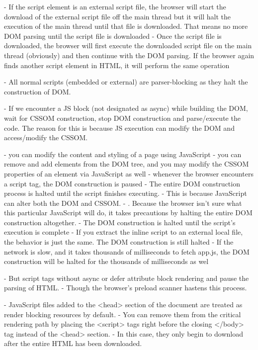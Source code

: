 - If the script element is an external script file, the browser will start the download of the external script file off the main thread but it will halt the execution of the main thread until that file is downloaded. That means no more DOM parsing until the script file is downloaded
- Once the script file is downloaded, the browser will first execute the downloaded script file on the main thread (obviously) and then continue with the DOM parsing. If the browser again finds another script element in HTML, it will perform the same operation

- All normal scripts (embedded or external) are parser-blocking as they halt the construction of DOM. 


- If we encounter a JS block (not designated as async) while building the DOM, wait for CSSOM construction, stop DOM construction and parse/execute the code. The reason for this is because JS execution can modify the DOM and access/modify the CSSOM.


- you can modify the content and styling of a page using JavaScript
- you can remove and add elements from the DOM tree, and you may modify the CSSOM properties of an element via JavaScript as well
- whenever the browser encounters a script tag, the DOM construction is paused
- The entire DOM construction process is halted until the script finishes executing.
- This is because JavaScript can alter both the DOM and CSSOM.
- . Because the browser isn’t sure what this particular JavaScript will do, it takes precautions by halting the entire DOM construction altogether.
- The DOM construction is halted until the script’s execution is complete
- If you extract the inline script to an external local file, the behavior is just the same. The DOM construction is still halted
- If the network is slow, and it takes thousands of milliseconds to fetch app.js, the DOM construction will be halted for the thousands of milliseconds as wel

- But script tags without async or defer attribute block rendering and pause the parsing of HTML.
- Though the browser's preload scanner hastens this process.


- JavaScript files added to the <head> section of the document are treated as render blocking resources by default.
- You can remove them from the critical rendering path by placing the <script> tags right before the closing </body> tag instead of the <head> section.
- In this case, they only begin to download after the entire HTML has been downloaded.

